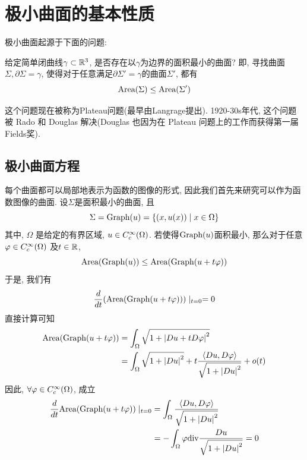 \chapter{极小曲面的基本性质}
极小曲面起源于下面的问题:
\begin{question*}
    给定简单闭曲线$\gamma \subset \mathbb{R}^3$, 是否存在以$\gamma$为边界的面积最小的曲面? 即, 寻找曲面$\Sigma, \partial \Sigma = \gamma$, 使得对于任意满足$\partial \Sigma' = \gamma$的曲面$\Sigma'$, 都有
    \begin{equation*}
        \text{Area}(\Sigma) \le \text{Area}(\Sigma')
    \end{equation*}
\end{question*}
这个问题现在被称为Plateau问题(最早由Langrage提出). 1920-30s年代, 这个问题被 Rado 和 Douglas 解决(Douglas 也因为在 Plateau 问题上的工作而获得第一届Fields奖).
\section{极小曲面方程}
每个曲面都可以局部地表示为函数的图像的形式, 因此我们首先来研究可以作为函数图像的曲面. 设$\Sigma$是面积最小的曲面, 且
\begin{equation*}
    \Sigma= \text{Graph}(u)= \{(x,u(x))\mid x \in \Omega\}
\end{equation*}
其中, $\Omega$ 是给定的有界区域, $u \in {C^\infty_c}(\Omega)$. 若使得$\text{Graph}(u)$面积最小, 那么对于任意$\varphi \in {C^\infty_c}(\Omega)$ 及$t \in \mathbb{R}$,
\begin{equation}
    \text{Area}(\text{Graph}(u)) \le \text{Area}(\text{Graph}(u+t\varphi))
\end{equation}
于是, 我们有
\begin{equation}
    \frac{d}{dt}(\text{Area}(\text{Graph}(u+t\varphi)))\mid_ {t=0}=0
\end{equation}
直接计算可知
\begin{equation}
    \begin{split}
        \text{Area}(\text{Graph}(u+t\varphi)) &= \int_\Omega \sqrt{1+\left | Du+tD\varphi \right |^2} \\
                          &= \int_\Omega \sqrt{1+\left | Du \right |^2}+t\frac{{\left < Du, D\varphi \right >}}{\sqrt{1+\left | Du \right |^2}} + o(t)
    \end{split}
\end{equation}
因此, $\forall \varphi \in {C^\infty_c}(\Omega)$, 成立
\begin{equation}
    \begin{split}
        \frac{d}{dt} \text{Area}(\text{Graph}(u+t\varphi))\mid _{t=0} & = \int_\Omega \frac{{\left < Du, D\varphi \right >}}{\sqrt{1+\left | Du \right |^2}} \\
        &=- \int_\Omega \varphi {\text{div}} \frac{Du}{\sqrt{1+\left | Du \right |^2}} =0
    \end{split}
\end{equation}
